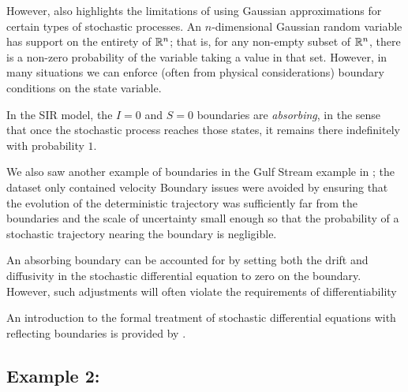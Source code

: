 However,  also highlights the limitations of using Gaussian approximations for certain types of stochastic processes.
An \(n\)-dimensional Gaussian random variable has support on the entirety of \(\mathbb{R}^n\); that is, for any non-empty subset of \(\mathbb{R}^n\), there is a non-zero probability of the variable taking a value in that set.
However, in many situations we can enforce (often from physical considerations) boundary conditions on the state variable.

In the SIR model, the \(I = 0\) and \(S = 0\) boundaries are \emph{absorbing}, in the sense that once the stochastic process reaches those states, it remains there indefinitely with probability \(1\).

We also saw another example of boundaries in the Gulf Stream example in ; the dataset only contained velocity
Boundary issues were avoided by ensuring that the evolution of the deterministic trajectory was sufficiently far from the boundaries and the scale of uncertainty small enough so that the probability of a stochastic trajectory nearing the boundary is negligible.

An absorbing boundary can be accounted for by setting both the drift and diffusivity in the stochastic differential equation to zero on the boundary.
However, such adjustments will often violate the requirements of differentiability

An introduction to the formal treatment of stochastic differential equations with reflecting boundaries is provided by \citet{Pilipenko_2014_IntroductionStochasticDifferential}.



\subsection{Example 2: }

